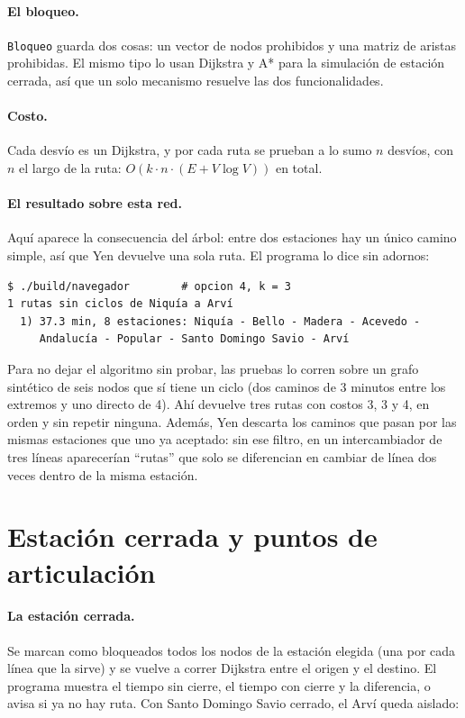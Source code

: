 \documentclass[11pt,a4paper]{article}
\newcommand{\arch}[1]{\texttt{#1}}
\begin{document}
\paragraph{El bloqueo.}
\arch{Bloqueo} guarda dos cosas: un vector de nodos prohibidos y una matriz de
aristas prohibidas. El mismo tipo lo usan Dijkstra y A* para la simulación de
estación cerrada, así que un solo mecanismo resuelve las dos funcionalidades.

\paragraph{Costo.}
Cada desvío es un Dijkstra, y por cada ruta se prueban a lo sumo $n$ desvíos,
con $n$ el largo de la ruta: $O(k \cdot n \cdot (E + V\log V))$ en total.

\paragraph{El resultado sobre esta red.}
Aquí aparece la consecuencia del árbol: entre dos estaciones hay un único camino
simple, así que Yen devuelve una sola ruta. El programa lo dice sin adornos:

\begin{lstlisting}[style=term]
$ ./build/navegador        # opcion 4, k = 3
1 rutas sin ciclos de Niquía a Arví
  1) 37.3 min, 8 estaciones: Niquía - Bello - Madera - Acevedo -
     Andalucía - Popular - Santo Domingo Savio - Arví
\end{lstlisting}

Para no dejar el algoritmo sin probar, las pruebas lo corren sobre un grafo
sintético de seis nodos que sí tiene un ciclo (dos caminos de 3 minutos entre los
extremos y uno directo de 4). Ahí devuelve tres rutas con costos 3, 3 y 4, en
orden y sin repetir ninguna. Además, Yen descarta los caminos que pasan por las
mismas estaciones que uno ya aceptado: sin ese filtro, en un intercambiador de
tres líneas aparecerían ``rutas'' que solo se diferencian en cambiar de línea dos
veces dentro de la misma estación.

\section{Estación cerrada y puntos de articulación}

\paragraph{La estación cerrada.}
Se marcan como bloqueados todos los nodos de la estación elegida (una por cada
línea que la sirve) y se vuelve a correr Dijkstra entre el origen y el destino. El
programa muestra el tiempo sin cierre, el tiempo con cierre y la diferencia, o
avisa si ya no hay ruta. Con Santo Domingo Savio cerrado, el Arví queda aislado:
\end{document}
